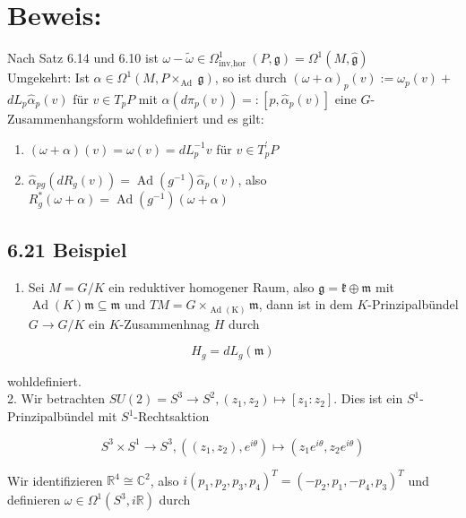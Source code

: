 \documentclass[10pt, letterpaper]{article}
\begin{document}
\section*{Beweis:}
Nach Satz 6.14 und 6.10 ist $\omega-\tilde{\omega} \in \Omega_{\text {inv,hor }}^{1}(P, \mathfrak{g})=\Omega^{1}(M, \hat{\mathfrak{g}})$\\
Umgekehrt: Ist $\alpha \in \Omega^{1}\left(M, P \times_{\text {Ad }} \mathfrak{g}\right)$, so ist durch $(\omega+\alpha)_{p}(v):=\omega_{p}(v)+$ $d L_{p} \hat{\alpha}_{p}(v)$ für $v \in T_{p} P$ mit $\alpha\left(d \pi_{p}(v)\right)=:\left[p, \hat{\alpha}_{p}(v)\right]$ eine $G$-Zusammenhangsform wohldefiniert und es gilt:

\begin{enumerate}
  \item $(\omega+\alpha)(v)=\omega(v)=d L_{p}^{-1} v$ für $v \in T_{p}^{\prime} P$
  \item $\hat{\alpha}_{p g}\left(d R_{g}(v)\right)=\operatorname{Ad}\left(g^{-1}\right) \hat{\alpha}_{p}(v)$, also $R_{g}^{*}(\omega+\alpha)=\operatorname{Ad}\left(g^{-1}\right)(\omega+\alpha)$
\end{enumerate}

\subsection*{6.21 Beispiel}
\begin{enumerate}
  \item Sei $M=G / K$ ein reduktiver homogener Raum, also $\mathfrak{g}=\mathfrak{k} \oplus \mathfrak{m}$ mit $\operatorname{Ad}(K) \mathfrak{m} \subseteq \mathfrak{m}$ und $T M=G \times_{\operatorname{Ad}(\mathrm{K})} \mathfrak{m}$, dann ist in dem $K$-Prinzipalbündel $G \rightarrow G / K$ ein $K$-Zusammenhnag $H$ durch
\end{enumerate}

$$
H_{g}=d L_{g}(\mathfrak{m})
$$

wohldefiniert.\\
2. Wir betrachten $S U(2)=S^{3} \rightarrow S^{2},\left(z_{1}, z_{2}\right) \mapsto\left[z_{1}: z_{2}\right]$. Dies ist ein $S^{1}$-Prinzipalbündel mit $S^{1}$-Rechtsaktion

$$
S^{3} \times S^{1} \rightarrow S^{3},\left(\left(z_{1}, z_{2}\right), e^{i \theta}\right) \mapsto\left(z_{1} e^{i \theta}, z_{2} e^{i \theta}\right)
$$

Wir identifizieren $\mathbb{R}^{4} \cong \mathbb{C}^{2}$, also $i\left(p_{1}, p_{2}, p_{3}, p_{4}\right)^{T}=\left(-p_{2}, p_{1},-p_{4}, p_{3}\right)^{T}$ und definieren $\omega \in \Omega^{1}\left(S^{3}, i \mathbb{R}\right)$ durch
\end{document}
